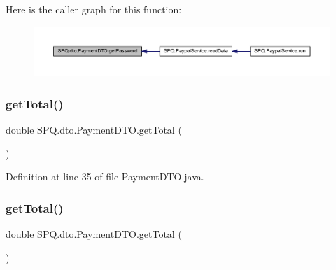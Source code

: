 Here is the caller graph for this function\+:\nopagebreak
\begin{figure}[H]
\begin{center}
\leavevmode
\includegraphics[width=350pt]{class_s_p_q_1_1dto_1_1_payment_d_t_o_ae012449dd0baea7f169bb64dcf973dec_icgraph}
\end{center}
\end{figure}
\mbox{\label{class_s_p_q_1_1dto_1_1_payment_d_t_o_a04cd2104d07971407126fcf75ef17d5b}} 
\subsubsection{\texorpdfstring{get\+Total()}{getTotal()}\hspace{0.1cm}{\footnotesize\ttfamily [1/3]}}
{\footnotesize\ttfamily double S\+P\+Q.\+dto.\+Payment\+D\+T\+O.\+get\+Total (\begin{DoxyParamCaption}{ }\end{DoxyParamCaption})}



Definition at line 35 of file Payment\+D\+T\+O.\+java.

\mbox{\label{class_s_p_q_1_1dto_1_1_payment_d_t_o_a04cd2104d07971407126fcf75ef17d5b}} 
\subsubsection{\texorpdfstring{get\+Total()}{getTotal()}\hspace{0.1cm}{\footnotesize\ttfamily [2/3]}}
{\footnotesize\ttfamily double S\+P\+Q.\+dto.\+Payment\+D\+T\+O.\+get\+Total (\begin{DoxyParamCaption}{ }\end{DoxyParamCaption})}



